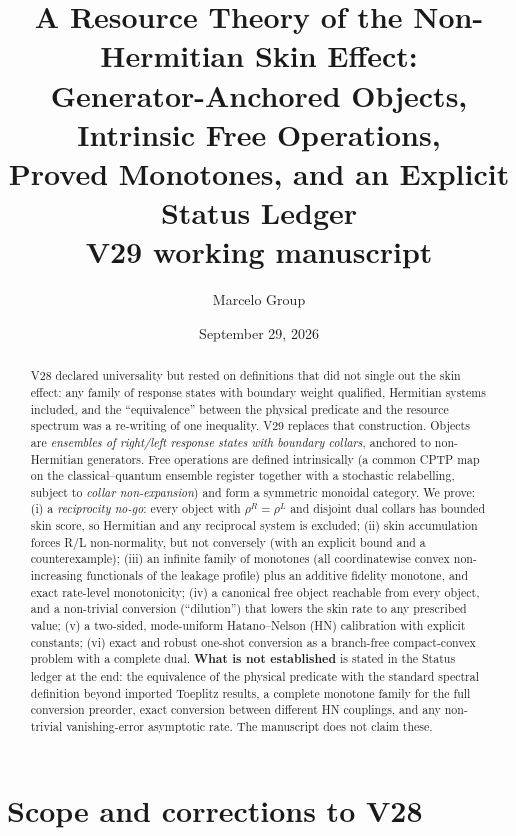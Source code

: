 \documentclass[11pt]{article}
\title{A Resource Theory of the Non-Hermitian Skin Effect:\\
Generator-Anchored Objects, Intrinsic Free Operations,\\
Proved Monotones, and an Explicit Status Ledger\\[2pt]\large V29 working manuscript}
\author{Marcelo Group}
\date{September 29, 2026}
\theoremstyle{definition}
\theoremstyle{remark}
\begin{document}
\maketitle

\begin{abstract}
V28 declared universality but rested on definitions that did not single out the skin effect: any family of response states with boundary weight qualified, Hermitian systems included, and the ``equivalence'' between the physical predicate and the resource spectrum was a re-writing of one inequality. V29 replaces that construction.
Objects are \emph{ensembles of right/left response states with boundary collars}, anchored to non-Hermitian generators. Free operations are defined intrinsically (a common CPTP map on the classical--quantum ensemble register together with a stochastic relabelling, subject to \emph{collar non-expansion}) and form a symmetric monoidal category. We prove:
(i) a \emph{reciprocity no-go}: every object with $\rho^R=\rho^L$ and disjoint dual collars has bounded skin score, so Hermitian and any reciprocal system is excluded;
(ii) skin accumulation forces R/L non-normality, but not conversely (with an explicit bound and a counterexample);
(iii) an infinite family of monotones (all coordinatewise convex non-increasing functionals of the leakage profile) plus an additive fidelity monotone, and exact rate-level monotonicity;
(iv) a canonical free object reachable from every object, and a non-trivial conversion (``dilution'') that lowers the skin rate to any prescribed value;
(v) a two-sided, mode-uniform Hatano--Nelson (HN) calibration with explicit constants;
(vi) exact and robust one-shot conversion as a branch-free compact-convex problem with a complete dual.
\textbf{What is not established} is stated in the Status ledger at the end: the equivalence of the physical predicate with the standard spectral definition beyond imported Toeplitz results, a complete monotone family for the full conversion preorder, exact conversion between different HN couplings, and any non-trivial vanishing-error asymptotic rate. The manuscript does not claim these.
\end{abstract}

\section{Scope and corrections to V28}
\label{sec:scope}
\end{document}
